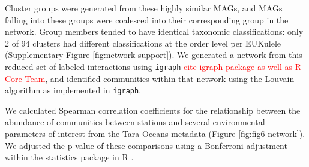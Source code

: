 \documentclass[12pt]{article}
\numberwithin{equation}{section}
\begin{document}
Cluster groups were generated from these highly similar MAGs, and MAGs falling into these groups were coalesced into their corresponding group in the network. Group members tended to have identical taxonomic classifications: only 2 of 94 clusters had different classifications at the order level per EUKulele (Supplementary Figure \ref{fig:network-support}). We generated a network from this reduced set of labeled interactions using \texttt{igraph} \textcolor{red}{cite igraph package as well as R Core Team}, and identified communities within that network using the Louvain algorithm as implemented in \texttt{igraph}. 

We calculated Spearman correlation coefficients for the relationship between the abundance of communities between stations and several environmental parameters of interest from the Tara Oceans metadata \citep{taraoceansconsortium2014ross} (Figure \ref{fig:fig6-network}). We adjusted the p-value of these comparisons using a Bonferroni adjustment within the statistics package in R \citep{teamr}. 





\end{document}
